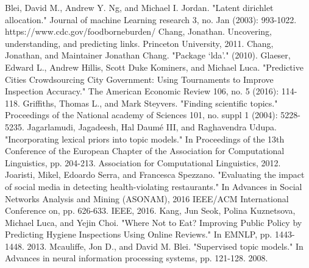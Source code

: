 \documentclass{article}
\begin{document}
\medskip

\small

\begin{thebibliography}{99}
 Blei, David M., Andrew Y. Ng, and Michael I. Jordan. "Latent dirichlet allocation." Journal of machine Learning research 3, no. Jan (2003): 993-1022.
 https://www.cdc.gov/foodborneburden/
 Chang, Jonathan. Uncovering, understanding, and predicting links. Princeton University, 2011.
 Chang, Jonathan, and Maintainer Jonathan Chang. "Package ‘lda’." (2010).
 Glaeser, Edward L., Andrew Hillis, Scott Duke Kominers, and Michael Luca. "Predictive Cities Crowdsourcing City Government: Using Tournaments to Improve Inspection Accuracy." The American Economic Review 106, no. 5 (2016): 114-118.
 Griffiths, Thomas L., and Mark Steyvers. "Finding scientific topics." Proceedings of the National academy of Sciences 101, no. suppl 1 (2004): 5228-5235.
 Jagarlamudi, Jagadeesh, Hal Daumé III, and Raghavendra Udupa. "Incorporating lexical priors into topic models." In Proceedings of the 13th Conference of the European Chapter of the Association for Computational Linguistics, pp. 204-213. Association for Computational Linguistics, 2012.
 Joaristi, Mikel, Edoardo Serra, and Francesca Spezzano. "Evaluating the impact of social media in detecting health-violating restaurants." In Advances in Social Networks Analysis and Mining (ASONAM), 2016 IEEE/ACM International Conference on, pp. 626-633. IEEE, 2016.
 Kang, Jun Seok, Polina Kuznetsova, Michael Luca, and Yejin Choi. "Where Not to Eat? Improving Public Policy by Predicting Hygiene Inspections Using Online Reviews." In EMNLP, pp. 1443-1448. 2013.
 Mcauliffe, Jon D., and David M. Blei. "Supervised topic models." In Advances in neural information processing systems, pp. 121-128. 2008.

\end{thebibliography}
\end{document}
